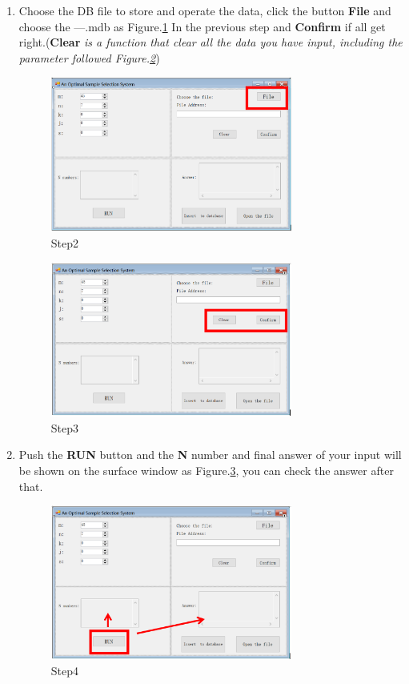 \begin{enumerate}
\item Choose the DB file to store and operate the data, click the button \textbf{File} and choose the ---.mdb as Figure.\ref{fig:st2}
In the previous step and \textbf{Confirm} if all get right.(\textbf{Clear}\textit{ is a function that clear all the data you have input, 
including the parameter followed \textup{Figure.\ref{fig:st3}}})
\begin{figure}[!htbp]
	\centering
	\includegraphics[width=0.75\textwidth]{images/step2.png}
	\caption{Step2}
	\label{fig:st2}
\end{figure}
\begin{figure}[!htbp]
	\centering
	\includegraphics[width=0.75\textwidth]{images/step3.png}
	\caption{Step3}
	\label{fig:st3}
\end{figure}

\item Push the \textbf{RUN} button and the \textbf{N} number and final answer of your input will be shown 
on the surface window as Figure.\ref{fig:st4}, you can check the answer after that.
\begin{figure}[!htbp]
	\centering
	\includegraphics[width=0.75\textwidth]{images/step4.png}
	\caption{Step4}
	\label{fig:st4}
\end{figure}


\end{enumerate}
